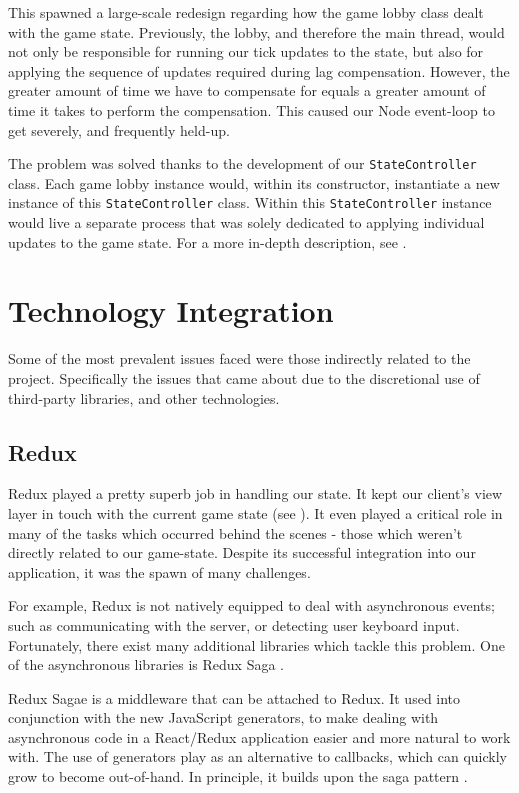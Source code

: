 \documentclass{standalone}
\begin{document}
		This spawned a large-scale redesign regarding how the game lobby class dealt with the game state. Previously, the lobby, and therefore the main thread, would not only be responsible for running our tick updates to the state, but also for applying the sequence of updates required during lag compensation. However, the greater amount of time we have to compensate for equals a greater amount of time it takes to perform the compensation. This caused our Node event-loop to get severely, and frequently held-up.

		The problem was solved thanks to the development of our \texttt{StateController} class. Each game lobby instance would, within its constructor, instantiate a new instance of this \texttt{StateController} class. Within this \texttt{StateController} instance would live a separate process that was solely dedicated to applying individual updates to the game state. For a more in-depth description, see .

	\section{Technology Integration}
		Some of the most prevalent issues faced were those indirectly related to the project. Specifically the issues that came about due to the discretional use of third-party libraries, and other technologies.

		\subsection{Redux}
			Redux played a pretty superb job in handling our state. It kept our client's view layer in touch with the current game state (see ). It even played a critical role in many of the tasks which occurred behind the scenes - those which weren't directly related to our game-state. Despite its successful integration into our application, it was the spawn of many challenges.

			For example, Redux is not natively equipped to deal with asynchronous events; such as communicating with the server, or detecting user keyboard input. Fortunately, there exist many additional libraries which tackle this problem. One of the asynchronous libraries is Redux Saga \parencite{reduxSaga}.

			Redux Sagae is a middleware that can be attached to Redux. It used into conjunction with the new JavaScript generators, to make dealing with asynchronous code in a React/Redux application easier and more natural to work with. The use of generators play as an alternative to callbacks, which can quickly grow to become out-of-hand. In principle, it builds upon the saga pattern \parencite{sagas}.
\end{document}
